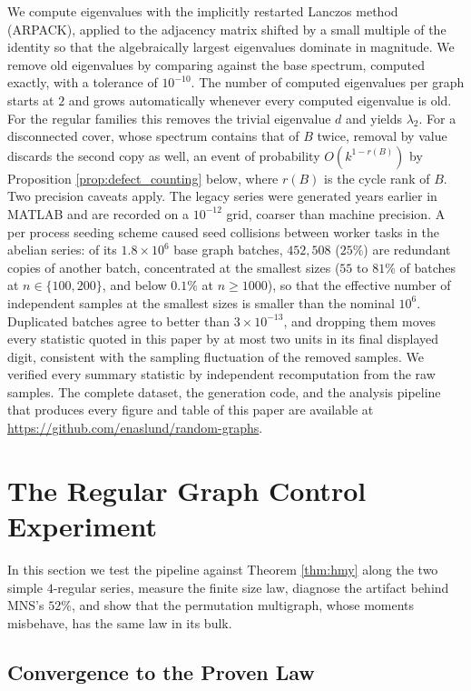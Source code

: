 \documentclass[12pt,oneside,english]{amsart}
\numberwithin{equation}{section}
\numberwithin{figure}{section}
\numberwithin{table}{section}
\theoremstyle{plain}
\numberwithin{thm}{section}
\theoremstyle{plain}
\theoremstyle{plain}
\theoremstyle{plain}
\theoremstyle{definition}
\theoremstyle{definition}
\theoremstyle{definition}
\theoremstyle{remark}
\begin{document}
We compute eigenvalues with the implicitly restarted Lanczos method
(ARPACK), applied to the adjacency matrix shifted by a small multiple
of the identity so that the algebraically largest eigenvalues dominate
in magnitude. We remove old eigenvalues by comparing against the
base spectrum, computed exactly, with a tolerance of $10^{-10}$.
The number of computed eigenvalues per graph starts at $2$ and grows
automatically whenever every computed eigenvalue is old. For the regular
families this removes the trivial eigenvalue $d$ and yields $\lambda_{2}$.
For a disconnected cover, whose spectrum contains that of $B$ twice,
removal by value discards the second copy as well, an event of probability
$O(k^{1-r(B)})$ by Proposition \ref{prop:defect_counting} below,
where $r(B)$ is the cycle rank of $B$. Two precision caveats apply.
The legacy series were generated years earlier in MATLAB and are recorded
on a $10^{-12}$ grid, coarser than machine precision. A per process
seeding scheme caused seed collisions between worker tasks in the
abelian series: of its $1.8\times10^{6}$ base graph batches, $452{,}508$
($25\%$) are redundant copies of another batch, concentrated at the
smallest sizes ($55$ to $81\%$ of batches at $n\in\{100,200\}$,
and below $0.1\%$ at $n\geq1000$), so that the effective number
of independent samples at the smallest sizes is smaller than the nominal
$10^{6}$. Duplicated batches agree to better than $3\times10^{-13}$,
and dropping them moves every statistic quoted in this paper by at
most two units in its final displayed digit, consistent with the sampling
fluctuation of the removed samples. We verified every summary statistic
by independent recomputation from the raw samples. The complete dataset,
the generation code, and the analysis pipeline that produces every
figure and table of this paper are available at \url{https://github.com/enaslund/random-graphs}.

\section{\label{sec:regular}The Regular Graph Control Experiment}

In this section we test the pipeline against Theorem \ref{thm:hmy}
along the two simple $4$-regular series, measure the finite size
law, diagnose the artifact behind MNS's $52\%$, and show that the
permutation multigraph, whose moments misbehave, has the same law
in its bulk.

\subsection{\label{subsec:regular_law}Convergence to the Proven Law}
\end{document}
